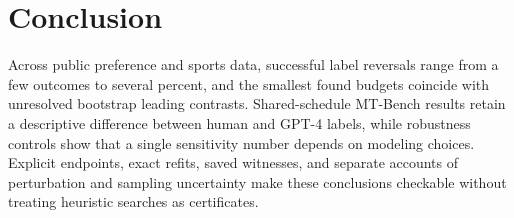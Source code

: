 \section{Conclusion}
Across public preference and sports data, successful label reversals range from a few outcomes to several percent, and the smallest found budgets coincide with unresolved bootstrap leading contrasts. Shared-schedule MT-Bench results retain a descriptive difference between human and GPT-4 labels, while robustness controls show that a single sensitivity number depends on modeling choices. Explicit endpoints, exact refits, saved witnesses, and separate accounts of perturbation and sampling uncertainty make these conclusions checkable without treating heuristic searches as certificates.
